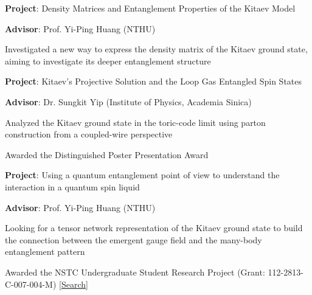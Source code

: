 \documentclass[12font]{article}
\begin{document}





    \begin{sublist}
        \item \textbf{Project}: Density Matrices and Entanglement Properties of the Kitaev Model
        \item \textbf{Advisor}: Prof. Yi-Ping Huang (NTHU) 
        \item Investigated a new way to express the density matrix of the Kitaev ground state, aiming to investigate its deeper entanglement structure
    \end{sublist}


    \begin{sublist}
        \item \textbf{Project}: Kitaev’s Projective Solution and the Loop Gas Entangled Spin States
        \item \textbf{Advisor}: Dr. Sungkit Yip (Institute of Physics, Academia Sinica)
        \item Analyzed the Kitaev ground state in the toric-code limit using parton construction from a coupled-wire perspective
        \item Awarded the Distinguished Poster Presentation Award
    \end{sublist}


    \begin{sublist}
        \item \textbf{Project}: Using a quantum entanglement point of view to understand the interaction in a quantum spin liquid
        \item \textbf{Advisor}: Prof. Yi-Ping Huang (NTHU)
        \item Looking for a tensor network representation of the Kitaev ground state to build the connection between the emergent gauge field and the many-body entanglement pattern
        \item Awarded the NSTC Undergraduate Student Research Project (Grant: 112-2813-C-007-004-M) [\href{https://wsts.nstc.gov.tw/STSWeb/Award/AwardMultiQuery.aspx?year=112&code=QS05&organ=D\%2cFDA1\%2cFDA1DB03&name=}{Search}]
    \end{sublist}
\end{document}
